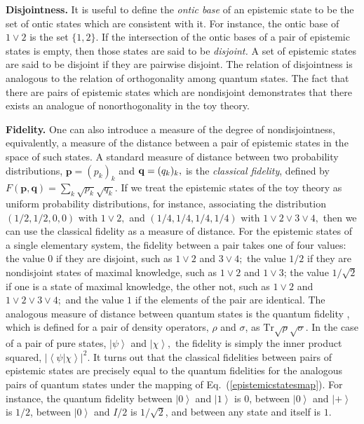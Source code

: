 \documentclass[pra,nofootinbib,showpacs,12pt]{revtex4}
\begin{document}
\textbf{Disjointness.} It is useful to define the \emph{ontic base }of an
epistemic state to be the set of ontic states which are consistent with it.
For instance, the ontic base of $1\vee 2$ is the set $\{1,2\}.$ If the
intersection of the ontic bases of a pair of epistemic states is empty, then
those states are said to be \emph{disjoint. }A set of epistemic states are
said to be disjoint if they are pairwise disjoint. The relation of
disjointness is analogous to the relation of orthogonality among quantum
states. The fact that there are pairs of epistemic states which are
nondisjoint demonstrates that there exists an analogue of nonorthogonality
in the toy theory.

\textbf{Fidelity.} One can also introduce a measure of the degree of
nondisjointness, equivalently, a measure of the distance between a pair of
epistemic states in the space of such states. A standard measure of distance
between two probability distributions, $\mathbf{p}=(p_{k})_{k}$ and $\mathbf{%
q}=(q_{k})_{k}\mathbf{,}$ is the \emph{classical fidelity}, defined by $F(%
\mathbf{p,q})=\sum_{k}\sqrt{p_{k}}\sqrt{q_{k}}.$ If we treat the epistemic
states of the toy theory as uniform probability distributions, for instance,
associating the distribution $(1/2,1/2,0,0)$ with $1\vee 2,$ and $%
(1/4,1/4,1/4,1/4)$ with $1\vee 2\vee 3\vee 4,$ then we can use the classical
fidelity as a measure of distance. For the epistemic states of a single
elementary system, the fidelity between a pair takes one of four values: the
value 0 if they are disjoint, such as $1\vee 2$ and $3\vee 4;$ the value $%
1/2 $ if they are nondisjoint states of maximal knowledge, such as $1\vee 2$
and $1\vee 3$; the value $1/\sqrt{2}$ if one is a state of maximal
knowledge, the other not, such as $1\vee 2$ and $1\vee 2\vee 3\vee 4;$ and
the value $1$ if the elements of the pair are identical. The analogous
measure of distance between quantum states is the quantum fidelity \cite%
{NielsenChuang}, which is defined for a pair of density operators, $\rho $
and $\sigma $, as $\mathrm{Tr}\sqrt{\rho }\sqrt{\sigma }.$ In the case of a
pair of pure states, $\left| \psi \right\rangle $ and $\left| \chi
\right\rangle ,$ the fidelity is simply the inner product squared, $\left|
\left\langle \psi |\chi \right\rangle \right| ^{2}.$ It turns out that the
classical fidelities between pairs of epistemic states are precisely equal
to the quantum fidelities for the analogous pairs of quantum states under
the mapping of Eq.~(\ref{epistemicstatesmap}). For instance, the quantum
fidelity between $\left| 0 \right\rangle$ and $\left| 1 \right\rangle$ is 0,
between $\left| 0 \right\rangle$ and $\left| + \right\rangle$ is $1/2$,
between $\left| 0 \right\rangle$ and $I/2$ is $1/\sqrt{2}$, and between any
state and itself is $1$.
\end{document}
